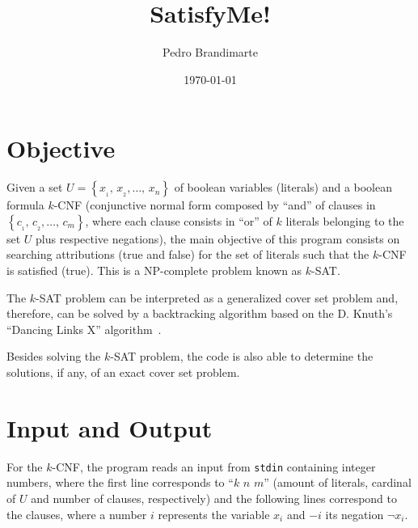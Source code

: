 \documentclass[12pt]{article}
\begin{document}
\thispagestyle{empty}

\title{SatisfyMe!\\[10pt]}

\author{Pedro Brandimarte\\[20pt]}

\date{\small{\today}}

\maketitle

\vspace{50pt}
\section{Objective}

Given a set $U = \left\{ x_{_1} , \, x_{_2} , \dots , \, x_n \right\}$ of boolean variables (literals) and a boolean formula $k$-CNF (conjunctive normal form composed by ``and'' of clauses in $\left\{ c_{_1} , \, c_{_2} , \dots , \, c_m \right\}$, where each clause consists in ``or'' of $k$ literals belonging to the set $U$ plus respective negations), the main objective of this program consists on searching attributions (true and false) for the set of literals such that the $k$-CNF is satisfied (true).
This is a NP-complete problem known as $k$-SAT.

The $k$-SAT problem can be interpreted as a generalized cover set problem and, therefore, can be solved by a backtracking algorithm based on the D. Knuth's ``Dancing Links X'' algorithm~\cite{knuthDLX}.

Besides solving the $k$-SAT problem, the code is also able to determine the solutions, if any, of an exact cover set problem.

\newpage



\section{Input and Output}

For the $k$-CNF, the program reads an input from \texttt{stdin} containing integer numbers, where the first line corresponds to ``$k$ $n$ $m$'' (amount of literals, cardinal of $U$ and number of clauses, respectively) and the following lines correspond to the clauses, where a number $i$ represents the variable $x_i$ and $- i$ its negation $\lnot x_i$.
\end{document}
